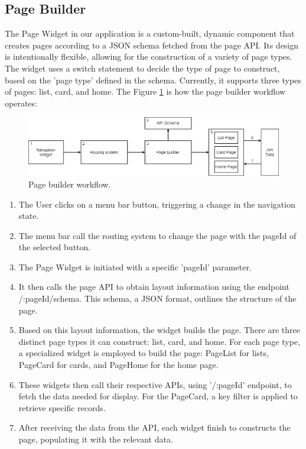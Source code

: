 \subsection{Page Builder}
The Page Widget in our application is a custom-built, dynamic component that creates pages according
to a JSON schema fetched from the page API. Its design is intentionally flexible, allowing for the
construction of a variety of page types. The widget uses a switch statement to decide the type of
page to construct, based on the 'page type' defined in the schema. Currently, it supports three
types of pages: list, card, and home. The Figure \ref{fig:5_page_builder} is how the page builder
workflow operates:

\begin{figure}
    \centering
    \includegraphics[scale=0.47]{Pictures/5_page_builder.png}
    \caption{Page builder workflow.}
    \label{fig:5_page_builder}
\end{figure}

\begin{enumerate}
    \item The User clicks on a menu bar button, triggering a change in the navigation state.
    \item The menu bar call the routing system to change the page with the pageId of the selected
          button.
    \item The Page Widget is initiated with a specific 'pageId' parameter.
    \item It then calls the page API to obtain layout information using the endpoint\\
          /:pageId/schema. This schema, a JSON format, outlines the structure of the page.
    \item Based on this layout information, the widget builds the page. There are three distinct
          page types it can construct: list, card, and home. For each page type, a specialized
          widget is employed to build the page: PageList for lists, PageCard for cards, and PageHome
          for the home page.
    \item These widgets then call their respective APIs, using '/:pageId' endpoint, to fetch the
          data needed for display. For the PageCard, a key filter is applied to retrieve specific records.
    \item After receiving the data from the API, each widget finish to constructs the page,
          populating it with the relevant data.
\end{enumerate}

